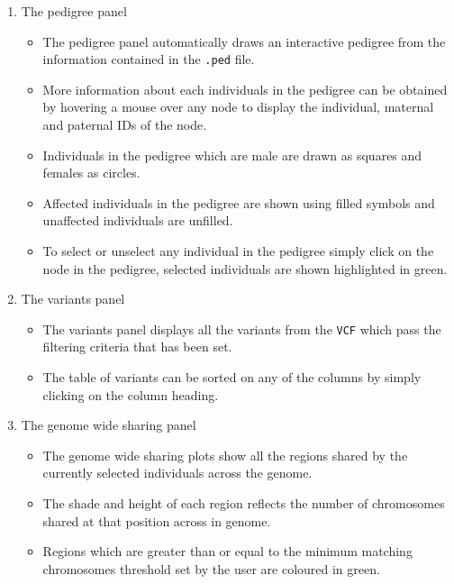 \documentclass{article}
\begin{document}
\begin{enumerate}
	\item{The pedigree panel}
		\begin{itemize}
			\item{The pedigree panel automatically draws an interactive pedigree from the information contained in the \texttt{.ped} file.}
			\item{More information about each individuals in the pedigree can be obtained by hovering a mouse over any node to display the individual, maternal and paternal IDs of the node.}
			\item{Individuals in the pedigree which are male are drawn as squares and females as circles.}
			\item{Affected individuals in the pedigree are shown using filled symbols and unaffected individuals are unfilled.}
			\item{To select or unselect any individual in the pedigree simply click on the node in the pedigree, selected individuals are shown highlighted in green.}
		\end{itemize}
	\item{The variants panel}
		\begin{itemize}
			\item{The variants panel displays all the variants from the \texttt{VCF} which pass the filtering criteria that has been set.}
			\item{The table of variants can be sorted on any of the columns by simply clicking on the column heading.}
		\end{itemize}
	\item{The genome wide sharing panel}
		\begin{itemize}
			\item{The genome wide sharing plots show all the regions shared by the currently selected individuals across the genome.}
			\item{The shade and height of each region reflects the number of chromosomes shared at that position across in genome.}
			\item{Regions which are greater than or equal to the minimum matching chromosomes threshold set by the user are coloured in green.}
		\end{itemize}	
\end{enumerate}
\end{document}
